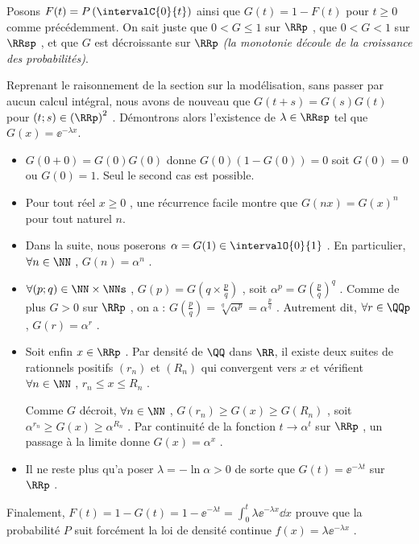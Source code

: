 Posons $F(t) = P\left( \intervalC{0}{t} \right)$ ainsi que $G(t) = 1 - F(t)$ pour $t \geq 0$ comme précédemment. On sait juste que $0 < G \leq 1$ sur $\RRp$ , que $0 < G < 1$ sur $\RRsp$ , et que $G$ est décroissante sur $\RRp$ \emph{(la monotonie découle de la croissance des probabilités)}.


\medskip


Reprenant le raisonnement de la section sur la modélisation, sans passer par aucun calcul intégral, nous avons de nouveau que $G(t+s) = G(s) G(t)$ pour $(t ; s) \in \left( \RRp \right)^2$ .
Démontrons alors l'existence de $\lambda \in \RRsp$ tel que $G(x) = \ee^{-\lambda x}$.

\begin{itemize}[label=\small\textbullet]
	\item $G(0 + 0) = G(0) G(0)$ donne $G(0)(1 - G(0)) = 0$ soit $G(0) = 0$ ou $G(0) = 1$. Seul le second cas est possible.

	


	\medskip
	\item Pour tout réel $x \geq 0$ , une récurrence facile montre que $G(nx) = G(x)^n$ pour tout naturel $n$.

	


	\medskip
	\item Dans la suite, nous poserons $\alpha = G(1) \in \intervalO{0}{1}$ .
	En particulier, $\forall n \in \NN$ , $G(n) = \alpha^n$ .

	


	\medskip
	\item $\forall (p ; q) \in \NN \times \NNs$ , $G(p) = G \left( q \times \frac{p}{q} \right)$ , soit $\alpha^p = G \left( \frac{p}{q} \right)^q$ .
	Comme de plus $G > 0$ sur $\RRp$ , on a : $G \left( \frac{p}{q} \right) = \sqrt[q\,\,]{\alpha^p} = \alpha^{\frac{p}{q}}$ .
	Autrement dit, $\forall r \in \QQp$ , $G(r) = \alpha^r$ .

	


	\medskip
	\item Soit enfin $x \in \RRp$ . Par densité de $\QQ$ dans $\RR$, il existe deux suites de rationnels positifs $(r_n)$ et $(R_n)$ qui convergent vers $x$ et vérifient $\forall n \in \NN$ , $r_n \leq x \leq R_n$ .
	
	\smallskip\noindent
	Comme $G$ décroit, $\forall n \in \NN$ , $G(r_n) \geq G(x) \geq G(R_n)$ , soit $\alpha^{r_n} \geq G(x) \geq \alpha^{R_n}$ .
	Par continuité de la fonction $t \rightarrow \alpha^t$ sur $\RRp$ , un passage à la limite donne $G(x) = \alpha^x$ .

	


	\medskip
	\item Il ne reste plus qu'a poser $\lambda = - \ln \alpha > 0$ de sorte que $G(t) = \ee^{- \lambda t}$ sur $\RRp$ .
\end{itemize}


Finalement, $\displaystyle F(t) = 1 - G(t) = 1 - \ee^{- \lambda t} = \int_0^t \lambda \ee^{-\lambda x} \dd{x}$ prouve que la probabilité $P$ suit forcément la loi de densité continue $f(x) = \lambda \ee^{-\lambda x}$ .
